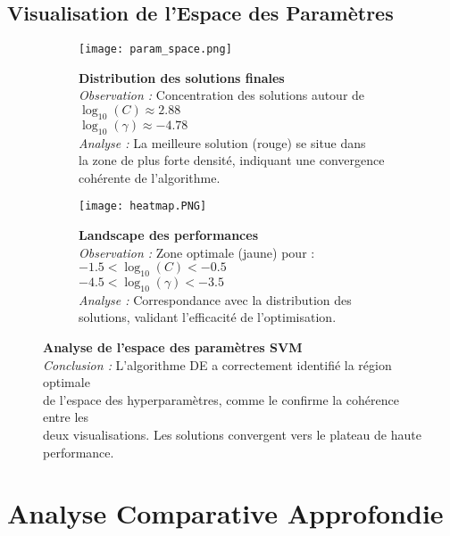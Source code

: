 \documentclass[a4paper, 12pt]{article}
\begin{document}
\subsection{Visualisation de l'Espace des Paramètres}
\begin{figure}[H]
\centering

\begin{subfigure}{0.48\textwidth}
\texttt{[image: param\_space.png]}
\caption{\textbf{Distribution des solutions finales} \\
\textit{Observation :} Concentration des solutions autour de \\
$\log_{10}(C) \approx 2.88$ \\ 
$\log_{10}(\gamma) \approx -4.78$ \\
\textit{Analyse :} La meilleure solution (rouge) se situe dans \\
la zone de plus forte densité, indiquant une convergence \\
cohérente de l'algorithme.}
\label{fig:param_dist}
\end{subfigure}
\hfill
\begin{subfigure}{0.48\textwidth}
\texttt{[image: heatmap.PNG]}
\caption{\textbf{Landscape des performances} \\
\textit{Observation :} Zone optimale (jaune) pour : \\
$-1.5 < \log_{10}(C) < -0.5$ \\
$-4.5 < \log_{10}(\gamma) < -3.5$ \\
\textit{Analyse :} Correspondance avec la distribution des \\
solutions, validant l'efficacité de l'optimisation.}
\label{fig:perf_heatmap}
\end{subfigure}

\caption{\textbf{Analyse de l'espace des paramètres SVM} \\
\textit{Conclusion :} L'algorithme DE a correctement identifié la région optimale \\
de l'espace des hyperparamètres, comme le confirme la cohérence entre les \\
deux visualisations. Les solutions convergent vers le plateau de haute performance.}
\label{fig:param_analysis}
\end{figure}
\section{Analyse Comparative Approfondie}
\end{document}
